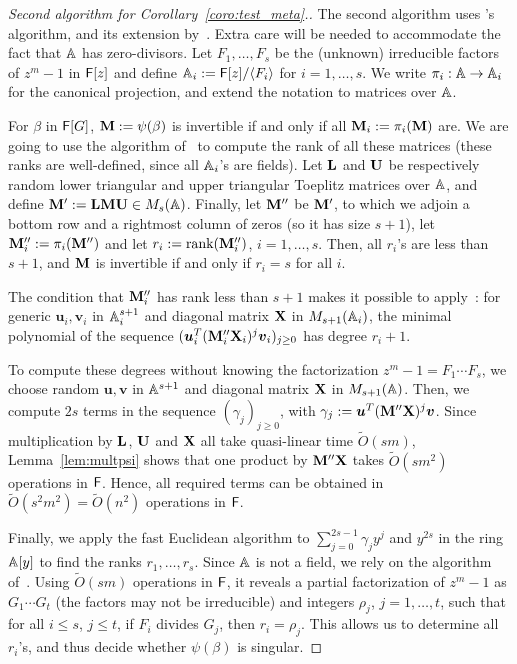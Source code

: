 \begin{proof}[Second algorithm for Corollary~\ref{coro:test_meta}.]
  The second algorithm uses \citeauthor{Wiedemann86}'s
  \citeyear{Wiedemann86} algorithm,
  and its extension by~. Extra care will be needed to
  accommodate the fact that $\mathbb{A}$ has zero-divisors. Let
  $F_1,\dots,F_s$ be the (unknown) irreducible factors of $z^m-1$ in
  ${\mathsf{F}}[z]$ and define $\mathbb{A}_i := {\mathsf{F}}[z]/\langle F_i \rangle$ for
  $i=1,\dots,s$. We write $\pi_i: \mathbb{A} \to\mathbb{A}_i$ for the canonical
  projection, and extend the notation to matrices over $\mathbb{A}$.

  For $\beta$ in ${\mathsf{F}}[G]$, $\mat M:=\psi(\beta)$ is invertible if and only
  if all $\mat M_i := \pi_i(\mat M)$ are. We are going to use the algorithm
  of~\cite[Section~4]{KaSa91} to compute the rank of all these matrices
  (these ranks are well-defined, since all $\mathbb{A}_i$'s are fields).  Let
  $\mat L$ and $\mat U$ be respectively random lower triangular and upper
  triangular Toeplitz matrices over $\mathbb{A}$, and define
  $\mat M':=\mat L \mat M \mat U \in M_s(\A)$. Finally, let $\mat M''$ be
  $\mat M'$, to which we adjoin a bottom row and a rightmost column of
  zeros (so it has size $s+1$), let $\mat M''_i :=\pi_i(\mat M'')$ and let
  $r_i :=\text{rank}(\mat M''_i)$, $i=1,\dots,s$. Then, all $r_i$'s are
  less than $s+1$, and $\mat M$ is invertible if and only if $r_i=s$ for
  all $i$.

  The condition that $\mat M''_i$ has rank less than $s+1$ makes it
  possible to apply~\cite[Lemma~2]{KaSa91}: for generic
  $\boldsymbol{u}_i, \boldsymbol{v}_i$ in $\mathbb{A}_i^{s+1}$ and diagonal
  matrix $\mat X$ in $M_{s+1}(\mathbb{A}_i)$, the minimal polynomial of the
  sequence $(\boldsymbol{u}_i^T (\mat M''_i \mat X_i)^j
  \boldsymbol{v}_i)_{j \ge 0}$ has degree $r_i+1$.

  To compute these degrees without knowing the factorization $z^m-1 =
  F_1 \cdots F_s$, we choose random $\boldsymbol{u}, \boldsymbol{v}$
  in $\mathbb{A}^{s+1}$ and diagonal matrix $\mat X$ in $M_{s+1}(\mathbb{A})$.  Then,
  we compute $2s$ terms in the sequence $(\gamma_j)_{j\ge 0}$, with
  $\gamma_j:=\boldsymbol{u}^T (\mat M'' \mat X)^j
  \boldsymbol{v}$. Since multiplication by $\mat L$, $\mat U$ and
  $\mat X$ all take quasi-linear time $\tilde{O}(sm)$,
  Lemma~\ref{lem:multpsi} shows that one product by $\mat M'' \mat X$
  takes $\tilde{O}(sm^2)$ operations in ${\mathsf{F}}$. Hence, all required
  terms can be obtained in $\tilde{O}(s^2m^2)=\tilde{O}(n^2)$
  operations in ${\mathsf{F}}$.

  Finally, we apply the fast Euclidean algorithm to $\sum_{j=0}^{2s-1}
  \gamma_j y^j$ and $y^{2s}$ in the ring $\mathbb{A}[y]$ to find the ranks
  $r_1,\dots,r_s$.  Since $\mathbb{A}$ is not a field, we rely on the
  algorithm of~\cite{AcCoMa03,DaMMMScXi06}. Using $\tilde{O}(sm)$
  operations in ${\mathsf{F}}$, it reveals a partial factorization of $z^m-1$ as
  $G_1 \cdots G_t$ (the factors may not be irreducible) and integers
  $\rho_j$, $j=1,\dots,t$, such that for all $i \le s$, $j\le t$, if
  $F_i$ divides $G_j$, then $r_i=\rho_j$. This allows us to determine all
  $r_i$'s, and thus decide whether $\psi(\beta)$ is singular.
\end{proof}





